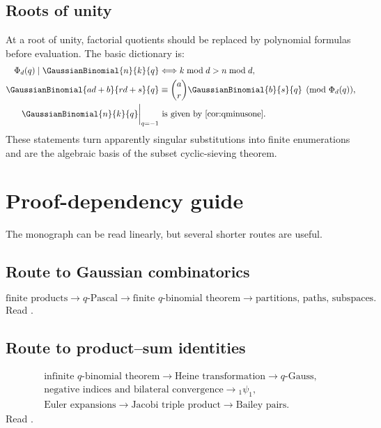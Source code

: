 \documentclass[11pt,a4paper,oneside,openany]{book}
\theoremstyle{definition}
\theoremstyle{remark}
\begin{document}
\section{Roots of unity}

At a root of unity, factorial quotients should be replaced by polynomial formulas before evaluation.  The basic dictionary is:
\begin{align*}
 \Phi_d(q)\mid\GaussianBinomial{n}{k}{q}
 &\Longleftrightarrow k\bmod d>n\bmod d,\\
 \GaussianBinomial{ad+b}{rd+s}{q}
 &\equiv\binom ar\GaussianBinomial{b}{s}{q}\pmod{\Phi_d(q)},\\
 \GaussianBinomial{n}{k}{q}\bigg|_{q=-1}
 &\text{ is given by \Cref{cor:qminusone}.}
\end{align*}
These statements turn apparently singular substitutions into finite enumerations and are the algebraic basis of the subset cyclic-sieving theorem.

\chapter{Proof-dependency guide}\label{app:dependencies}

The monograph can be read linearly, but several shorter routes are useful.

\section*{Route to Gaussian combinatorics}
\[
 \text{finite products}
 \longrightarrow q\text{-Pascal}
 \longrightarrow \text{finite }q\text{-binomial theorem}
 \longrightarrow \text{partitions, paths, subspaces}.
\]
Read .

\section*{Route to product--sum identities}
\[
\begin{gathered}
 \text{infinite }q\text{-binomial theorem}
 \longrightarrow \text{Heine transformation}
 \longrightarrow q\text{-Gauss},\\
 \text{negative indices and bilateral convergence}
 \longrightarrow {}_1\psi_1,\\
 \text{Euler expansions}
 \longrightarrow \text{Jacobi triple product}
 \longrightarrow \text{Bailey pairs}.
\end{gathered}
\]
Read .
\end{document}
